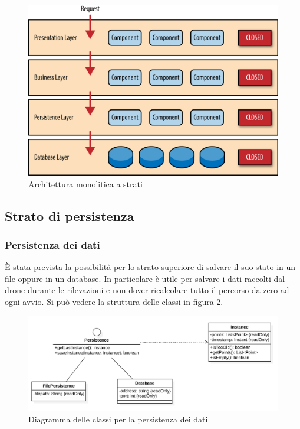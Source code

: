 \begin{figure}
    \centering
    \includegraphics[width=\textwidth]{immagini/layered_archiecture.png}
    \caption{Architettura monolitica a strati}
    \label{fig:layered_architecture}
\end{figure}

\subsection{Strato di persistenza}

\subsubsection{Persistenza dei dati}
È stata prevista la possibilità per lo strato superiore di salvare il suo stato in un file oppure in un database. In particolare è utile per salvare i dati raccolti dal drone durante le rilevazioni e non dover ricalcolare tutto il percorso da zero ad ogni avvio. Si può vedere la struttura delle classi in figura \ref{fig:class_diagram_persistence}.

\begin{figure}
    \centering
    \includegraphics[width=\textwidth]{immagini/persistence_classes.png}
    \caption{Diagramma delle classi per la persistenza dei dati}
    \label{fig:class_diagram_persistence}
\end{figure}

